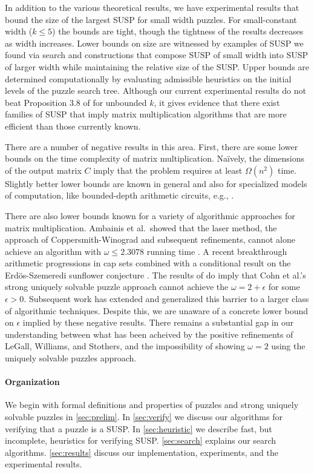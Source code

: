 \documentclass[11pt]{article}
\begin{document}

In addition to the various theoretical results, we have experimental
results that bound the size of the largest SUSP for small width
puzzles.  For small-constant width ($k \le 5$) the bounds are tight,
though the tightness of the results decreases as width increases.
Lower bounds on size are witnessed by examples of SUSP we found via
search and constructions that compose SUSP of small width into SUSP of
larger width while maintaining the relative size of the SUSP.  Upper
bounds are determined computationally by evaluating admissible
heuristics on the initial levels of the puzzle search tree.  Although
our current experimental results do not beat Proposition 3.8 of
\cite{cksu05} for unbounded $k$, it gives evidence that there exist
families of SUSP that imply matrix multiplication algorithms that are
more efficient than those currently known.

There are a number of negative results in this area.  First, there are
some lower bounds on the time complexity of matrix multiplication.
Na\"{i}vely, the dimensions of the output matrix $C$ imply that the
problem requires at least $\Omega(n^2)$ time.  Slightly better lower
bounds are known in general and also for specialized models of
computation, like bounded-depth arithmetic circuits, e.g.,
\cite{shp03,kam05}.

There are also lower bounds known for a variety of algorithmic
approaches for matrix multiplication.  Ambainis et al.~showed that the
laser method, the approach of Coppersmith-Winograd and subsequent
refinements, cannot alone achieve an algorithm with $\omega \le
2.3078$ running time \cite{afl15}.  A recent breakthrough arithmetic
progressions in cap sets \cite{clp17} combined with a conditional
result on the Erd\"{o}s-Szemeredi sunflower conjecture \cite{asu13}.
The results of \cite{bccgu16} do imply that Cohn et al.'s strong
uniquely solvable puzzle approach cannot achieve the $\omega = 2 +
\epsilon$ for some $\epsilon > 0$.  Subsequent work has extended and
generalized this barrier \cite{avw18a,avw18b} to a larger class of
algorithmic techniques.  Despite this, we are unaware of a concrete
lower bound on $\epsilon$ implied by these negative results.  There
remains a substantial gap in our understanding between what has been
acheived by the positive refinements of LeGall, Williams, and
Stothers, and the impossibility of showing $\omega = 2$ using the
uniquely solvable puzzles approach.

\paragraph{Organization}
We begin with formal definitions and properties of puzzles and strong
uniquely solvable puzzles in \autoref{sec:prelim}.  In
\autoref{sec:verify} we discuss our algorithms for verifying that a
puzzle is a SUSP.  In \autoref{sec:heuristic} we describe fast, but
incomplete, heuristics for verifying SUSP.  \autoref{sec:search}
explains our search algorithms.  \autoref{sec:results} discuss our
implementation, experiments, and the experimental results.
\end{document}
